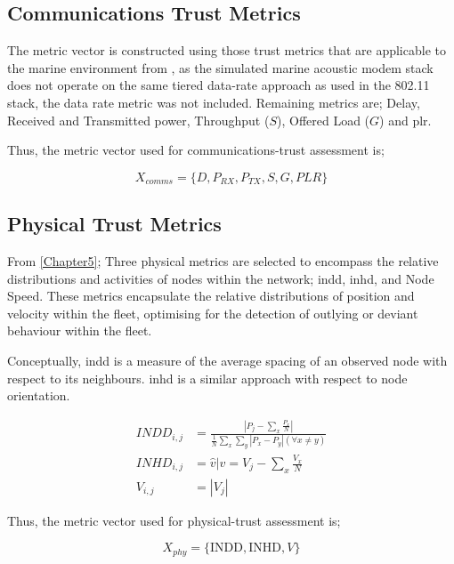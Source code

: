 \subsection{Communications Trust Metrics}

The metric vector is constructed using those trust metrics that are applicable to the marine environment from \cite{Guo2012}, as the simulated marine acoustic modem stack does not operate on the same tiered data-rate approach as used in the 802.11 stack, the data rate metric was not included. Remaining metrics are; Delay, Received and Transmitted power, Throughput ($S$), Offered Load ($G$) and \gls{plr}.

Thus, the metric vector used for communications-trust assessment is;

\begin{equation}
  X_{comms}=\{D, P_{RX}, P_{TX}, S, G, PLR\}
  \label{eq:comms_vector}
\end{equation}

\subsection{Physical Trust Metrics}

From \autoref{Chapter5}; Three physical metrics are selected to encompass the relative distributions and activities of nodes within the network; \gls{indd}, \gls{inhd}, and Node Speed. These metrics encapsulate the relative distributions of position and velocity within the fleet, optimising for the detection of outlying or deviant behaviour within the fleet.

Conceptually, \gls{indd} is a measure of the average spacing of an observed node with respect to its neighbours. \gls{inhd} is a similar approach with respect to node orientation.

\begin{align}
  INDD_{i,j} &= \frac{|P_j - \sum_x \frac{P_x}{N}|}{\frac{1}{N}\sum_x \sum_y{|P_x - P_y| (\forall x \neq y)}}\\
  INHD_{i,j} &= \hat{v} \vert v= V_j - \sum_x{\frac{V_x}{N}}\\
  V_{i,j} &= |V_j|
\end{align}

Thus, the metric vector used for physical-trust assessment is;

\begin{equation}
  X_{phy}=\{\text{INDD}, \text{INHD}, V\}
  \label{eq:phys:vector}
\end{equation}


